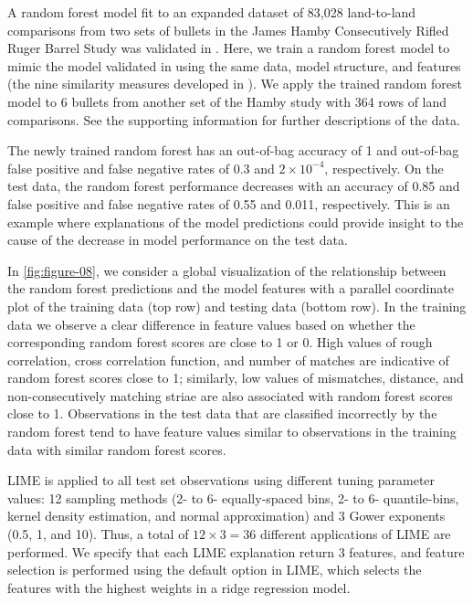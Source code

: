 \documentclass[AMS,STIX2COL]{WileyNJD-v2}\usepackage[]{graphicx}\usepackage[]{color}
\begin{document}
A random forest model fit to an expanded dataset of 83,028 land-to-land comparisons from two sets of bullets in the James Hamby Consecutively Rifled Ruger Barrel Study \citep{hamby:2009} was validated in \citet{vanderplas:2020}. Here, we train a random forest model to mimic the model validated in \citet{vanderplas:2020} using the same data, model structure, and features (the nine similarity measures developed in \citet{hare:2017}). We apply the trained random forest model to 6 bullets from another set of the Hamby study with 364 rows of land comparisons. See the supporting information for further descriptions of the data. 

The newly trained random forest has an out-of-bag accuracy of 1 and out-of-bag false positive and false negative rates of 0.3 and \ensuremath{2\times 10^{-4}}, respectively. On the test data, the random forest performance decreases with an accuracy of 0.85 and false positive and false negative rates of 0.55 and 0.011, respectively. This is an example where explanations of the model predictions could provide insight to the cause of the decrease in model performance on the test data.

In \autoref{fig:figure-08}, we consider a global visualization of the relationship between the random forest predictions and the model features with a parallel coordinate plot of the training data (top row) and testing data (bottom row). In the training data we observe a clear difference in feature values based on whether the corresponding random forest scores are close to 1 or 0. High values of rough correlation, cross correlation function, and number of matches are indicative of random forest scores close to 1; similarly, low values of mismatches, distance, and non-consecutively matching striae are also associated with random forest scores close to 1. Observations in the test data that are classified incorrectly by the random forest tend to have feature values similar to observations in the training data with similar random forest scores. 

LIME is applied to all test set observations using different tuning parameter values: 12 sampling methods (2- to 6- equally-spaced bins, 2- to 6- quantile-bins, kernel density estimation, and normal approximation) and 3 Gower exponents (0.5, 1, and 10). Thus, a total of $12\times 3=36$ different applications of LIME are performed. We specify that each LIME explanation return 3 features, and feature selection is performed using the default option in LIME, which selects the features with the highest weights in a ridge regression model.
\end{document}
